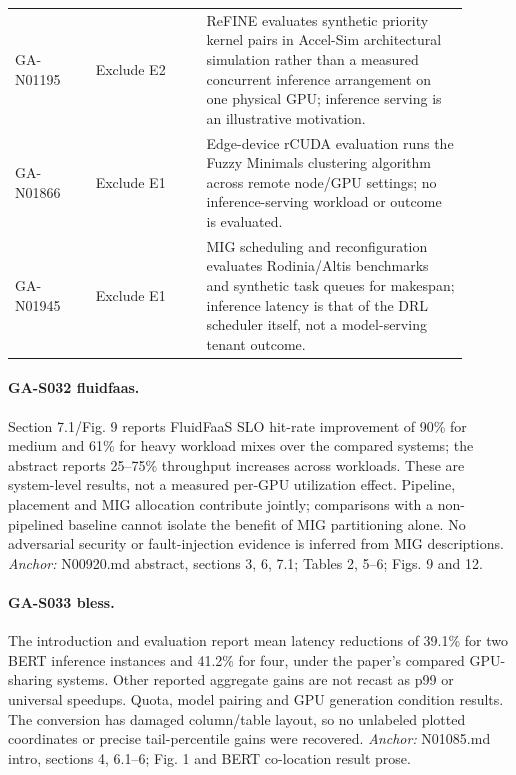 \begin{longtable}{P{0.16\linewidth}P{0.22\linewidth}P{0.52\linewidth}}
GA-N01195 & Exclude E2 & ReFINE evaluates synthetic priority kernel pairs in Accel-Sim architectural simulation rather than a measured concurrent inference arrangement on one physical GPU; inference serving is an illustrative motivation.\\

GA-N01866 & Exclude E1 & Edge-device rCUDA evaluation runs the Fuzzy Minimals clustering algorithm across remote node/GPU settings; no inference-serving workload or outcome is evaluated.\\

GA-N01945 & Exclude E1 & MIG scheduling and reconfiguration evaluates Rodinia/Altis benchmarks and synthetic task queues for makespan; inference latency is that of the DRL scheduler itself, not a model-serving tenant outcome.\\

\bottomrule\end{longtable}

\paragraph{GA-S032 fluidfaas.} Section 7.1/Fig. 9 reports FluidFaaS SLO hit-rate improvement of 90\% for medium and 61\% for heavy workload mixes over the compared systems; the abstract reports 25–75\% throughput increases across workloads. These are system-level results, not a measured per-GPU utilization effect. Pipeline, placement and MIG allocation contribute jointly; comparisons with a non-pipelined baseline cannot isolate the benefit of MIG partitioning alone. No adversarial security or fault-injection evidence is inferred from MIG descriptions. \textit{Anchor:} N00920.md abstract, sections 3, 6, 7.1; Tables 2, 5–6; Figs. 9 and 12.

\paragraph{GA-S033 bless.} The introduction and evaluation report mean latency reductions of 39.1\% for two BERT inference instances and 41.2\% for four, under the paper's compared GPU-sharing systems. Other reported aggregate gains are not recast as p99 or universal speedups. Quota, model pairing and GPU generation condition results. The conversion has damaged column/table layout, so no unlabeled plotted coordinates or precise tail-percentile gains were recovered. \textit{Anchor:} N01085.md intro, sections 4, 6.1–6; Fig. 1 and BERT co-location result prose.

